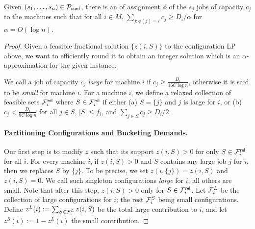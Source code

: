 \begin{theorem}\label{thm:conflprounding}
	Given $(s_1,\ldots,s_n) \in {\cal P}_\mathsf{conf}$, there is an of assignment $\phi$ of the $s_j$ jobs of capacity $c_j$  to the machines such that for all $i\in M$, 
	$\sum_{j:\phi(j) = i} c_j \geq D_i/\alpha$ for $\alpha = O(\log n)$.
\end{theorem}
\def\calFr{\calF^{\mathsf{rel}}}
\begin{proof}
		Given a feasible fractional solution $\{z(i,S)\}$ to the configuration LP above, we want to  efficiently round it to obtain an integer solution which is an $\alpha$-approximation for the given \cckp instance.
		\medskip 
		
		We call a job of capacity $c_j$ {\em large} for machine $i$ if $c_j \geq \frac{D_i}{16C\log n}$, otherwise it is said to be \emph{small} for machine $i$. 
		For a machine $i$, we define a relaxed collection of feasible sets $\calFr_i$ where $S\in \calFr_i$ if either (a) $S = \{j\}$ and $j$ is large for $i$, or (b) $c_j < \frac{D_i}{8C\log n}$ for all $j\in S$, $|S| \leq f_i$, and $\sum_{j\in S} c_j \geq D_i/2$.
	
		

%		
%				
\paragraph{Partitioning Configurations  and Bucketing Demands.}	
Our first step is  to modify $z$ such that its support $z(i,S) > 0$ for only $S\in \calFr_i$ for all $i$.
For every machine $i$, if $z(i,S) > 0$ and $S$ contains any large job $j$ for $i$, then we replaces $S$ by $\{j\}$. To be precise, we set $z(i,\{j\}) = z(i,S)$ and $z(i,S) = 0$.
We call such singleton configurations {\em large} for $i$; all others are small. Note that after this step, $z(i,S) > 0$ only for $S\in \calFr_i$.
Let ${\cal F}^L_i$ be the collection of large configurations for $i$; the rest ${\cal F}^S_i$ being small configurations.
		Define $z^L(i) := \sum_{S\in {\cal F}^L_i} z(i,S)$ be the total large contribution to $i$, and let $z^S(i) := 1 - z^L(i)$ the small contribution.



\end{proof}
